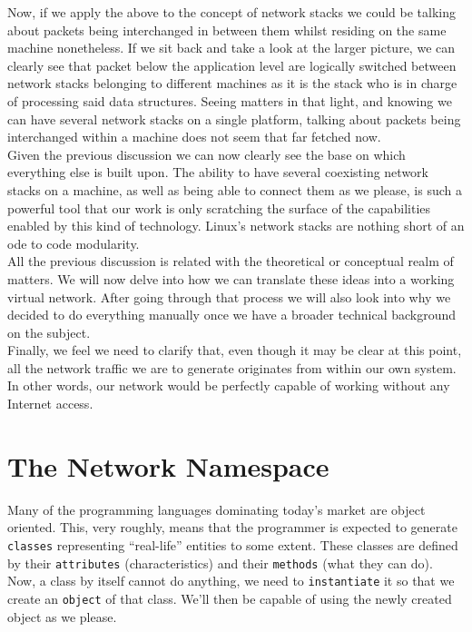         Now, if we apply the above to the concept of network stacks we could be talking about packets being interchanged in between them whilst residing on the same machine nonetheless. If we sit back and take a look at the larger picture, we can clearly see that packet below the application level are logically switched between network stacks belonging to different machines as it is the stack who is in charge of processing said data structures. Seeing matters in that light, and knowing we can have several network stacks on a single platform, talking about packets being interchanged within a machine does not seem that far fetched now.\\

        Given the previous discussion we can now clearly see the base on which everything else is built upon. The ability to have several coexisting network stacks on a machine, as well as being able to connect them as we please, is such a powerful tool that our work is only scratching the surface of the capabilities enabled by this kind of technology. Linux's network stacks are nothing short of an ode to code modularity.\\

        All the previous discussion is related with the theoretical or conceptual realm of matters. We will now delve into how we can translate these ideas into a working virtual network. After going through that process we will also look into why we decided to do everything manually once we have a broader technical background on the subject.\\

        Finally, we feel we need to clarify that, even though it may be clear at this point, all the network traffic we are to generate originates from within our own system. In other words, our network would be perfectly capable of working without any Internet access.\\

    \section{The Network Namespace}
        Many of the programming languages dominating today's market are object oriented. This, very roughly, means that the programmer is expected to generate \texttt{classes} representing ``real-life'' entities to some extent. These classes are defined by their \texttt{attributes} (characteristics) and their \texttt{methods} (what they can do). Now, a class by itself cannot do anything, we need to \texttt{instantiate} it so that we create an \texttt{object} of that class. We'll then be capable of using the newly created object as we please.\\

